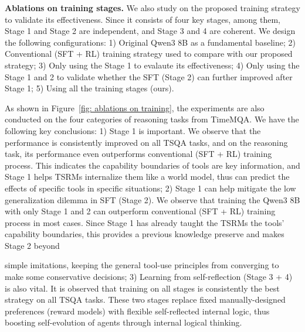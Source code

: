 \textbf{Ablations on training stages.} We also study on the proposed training strategy to validate its effectiveness. Since it consists of four key stages, among them, Stage 1 and Stage 2 are independent, and Stage 3 and 4 are coherent. We design the following configurations: 1) Original Qwen3 8B as a fundamental baseline; 2) Conventional (SFT + RL) training strategy used to compare with our proposed strategy; 3) Only using the Stage 1 to evalaute its effectiveness; 4) Only using the Stage 1 and 2 to validate whether the SFT (Stage 2) can further improved after Stage 1; 5) Using all the training stages (ours). 

As shown in Figure~\ref{fig: ablations on training}, the experiments are also conducted on the four categories of reasoning tasks from TimeMQA. We have the following key conclusions: 1) Stage 1 is important. We observe that the performance is consistently improved on all TSQA tasks, and on the reasoning task, its performance even outperforms conventional (SFT + RL) training process. This indicates the capability boundaries of tools are key information, and Stage 1 helps TSRMs internalize them like a world model, thus can predict the effects of specific tools in specific situations; 2) Stage 1 can help mitigate the low generalization dilemma in SFT (Stage 2). We observe that training the Qwen3 8B with only Stage 1 and 2 can outperform conventional (SFT + RL) training process in most cases. Since Stage 1 has already taught the TSRMs the tools' capability boundaries, this provides a previous knowledge preserve and makes Stage 2 beyond 


simple imitations, keeping the general tool-use principles from converging to make some conservative decisions; 3) Learning from self-reflection (Stage 3 + 4) is also vital. It is observed that training on all stages is consistently the best strategy on all TSQA tasks. These two stages replace fixed manually-designed preferences (reward models) with flexible self-reflected internal logic, thus boosting self-evolution of agents through internal logical thinking.